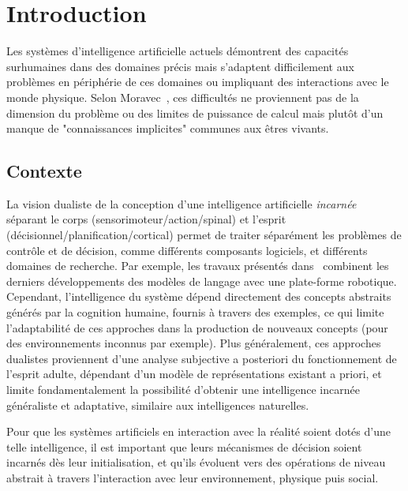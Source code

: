 
\chapter{Introduction}
Les systèmes d'intelligence artificielle actuels démontrent des capacités surhumaines dans des domaines précis mais
s'adaptent difficilement aux problèmes en périphérie de ces domaines ou impliquant des interactions avec le monde physique. 
Selon Moravec~\cite{moravec1988mind}, ces difficultés ne proviennent pas de la dimension du problème ou des limites de puissance de calcul mais plutôt d'un manque de "connaissances implicites" communes aux êtres vivants.


\section{Contexte}
La vision dualiste de la conception d'une intelligence artificielle \emph{incarnée}~\cite{arkin1997aura,Heess16,brohan2023rt} séparant le corps (sensorimoteur/action/spinal) et l'esprit (décisionnel/planification/cortical) permet de traiter séparément les problèmes de contrôle et de décision, comme différents composants logiciels, et différents domaines de recherche.
Par exemple, les travaux présentés dans~\cite{zhang2024vision} combinent les derniers développements des modèles de langage avec une plate-forme robotique.
Cependant, l'intelligence du système dépend directement des concepts abstraits générés par la cognition humaine, fournis à travers des exemples, ce qui limite l'adaptabilité de ces approches dans la production de nouveaux concepts (pour des environnements inconnus par exemple).
Plus généralement, ces approches dualistes proviennent d'une analyse subjective a posteriori du fonctionnement de l'esprit adulte, dépendant d'un modèle de représentations existant a priori, et limite fondamentalement la possibilité d'obtenir une intelligence incarnée généraliste et adaptative, similaire aux intelligences naturelles.

Pour que les systèmes artificiels en interaction avec la réalité soient dotés d'une telle intelligence, il est important que leurs mécanismes de décision soient incarnés dès leur initialisation, et qu'ils évoluent vers des opérations de niveau abstrait à travers l'interaction avec leur environnement, physique puis social.

